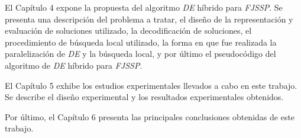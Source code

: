 El Capítulo 4 expone la propuesta del algoritmo \textit{DE} híbrido para \textit{FJSSP}. Se presenta una descripción del problema a tratar, el diseño de la representación y evaluación de soluciones utilizado, la decodificación de soluciones, el procedimiento de búsqueda local utilizado, la forma en que fue realizada la paralelización de \textit{DE} y la búsqueda local, y por último el pseudocódigo del algoritmo de \textit{DE} híbrido para \textit{FJSSP}.


El Capítulo 5 exhibe los estudios experimentales llevados a cabo en este trabajo. Se describe el diseño experimental y los resultados experimentales obtenidos.


Por último, el Capítulo 6 presenta las principales conclusiones obtenidas de este trabajo.